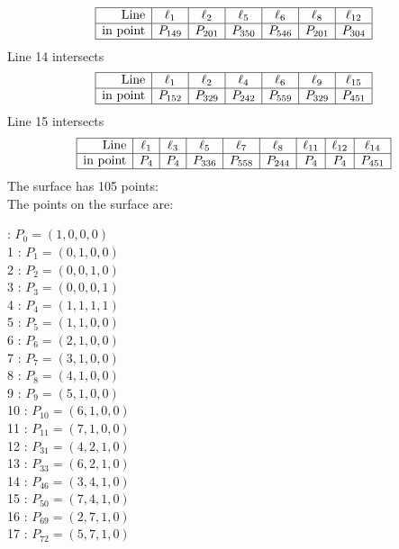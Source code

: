 \documentclass{article}
\begin{document}
{$$\begin{array}{|r*{6}{|c}|}
\hline
\mbox{Line}  & \ell_{1} & \ell_{2} & \ell_{5} & \ell_{6} & \ell_{8} & \ell_{12}\\
\hline
\mbox{in point}  & P_{149} & P_{201} & P_{350} & P_{546} & P_{201} & P_{304}\\
\hline
\end{array}
$$
Line 14 intersects 
$$
\begin{array}{|r*{6}{|c}|}
\hline
\mbox{Line}  & \ell_{1} & \ell_{2} & \ell_{4} & \ell_{6} & \ell_{9} & \ell_{15}\\
\hline
\mbox{in point}  & P_{152} & P_{329} & P_{242} & P_{559} & P_{329} & P_{451}\\
\hline
\end{array}
$$
Line 15 intersects 
$$
\begin{array}{|r*{8}{|c}|}
\hline
\mbox{Line}  & \ell_{1} & \ell_{3} & \ell_{5} & \ell_{7} & \ell_{8} & \ell_{11} & \ell_{12} & \ell_{14}\\
\hline
\mbox{in point}  & P_{4} & P_{4} & P_{336} & P_{558} & P_{244} & P_{4} & P_{4} & P_{451}\\
\hline
\end{array}
$$
The surface has 105 points:\\
The points on the surface are:\\
\begin{multicols}{3}
 : $P_{0}=( 1, 0, 0, 0 )$\\
1 : $P_{1}=( 0, 1, 0, 0 )$\\
2 : $P_{2}=( 0, 0, 1, 0 )$\\
3 : $P_{3}=( 0, 0, 0, 1 )$\\
4 : $P_{4}=( 1, 1, 1, 1 )$\\
5 : $P_{5}=( 1, 1, 0, 0 )$\\
6 : $P_{6}=( 2, 1, 0, 0 )$\\
7 : $P_{7}=( 3, 1, 0, 0 )$\\
8 : $P_{8}=( 4, 1, 0, 0 )$\\
9 : $P_{9}=( 5, 1, 0, 0 )$\\
10 : $P_{10}=( 6, 1, 0, 0 )$\\
11 : $P_{11}=( 7, 1, 0, 0 )$\\
12 : $P_{31}=( 4, 2, 1, 0 )$\\
13 : $P_{33}=( 6, 2, 1, 0 )$\\
14 : $P_{46}=( 3, 4, 1, 0 )$\\
15 : $P_{50}=( 7, 4, 1, 0 )$\\
16 : $P_{69}=( 2, 7, 1, 0 )$\\
17 : $P_{72}=( 5, 7, 1, 0 )$\\

\end{multicols}}
\end{document}

